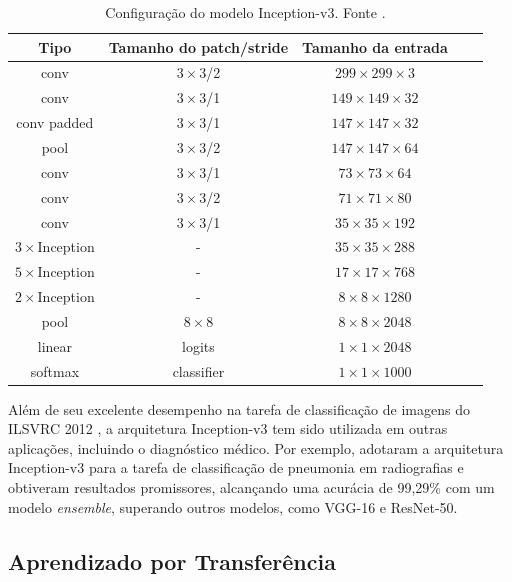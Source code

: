 \begin{table}[!htbp]
    \centering
    \footnotesize
    \begin{tabular}{|c|c|c|c|c|}
        \hline
        \textbf{Tipo} & \textbf{Tamanho do patch/stride} & \textbf{Tamanho da entrada} \\
        \hline
        conv & $3\times3$/2 & $299\times299\times3$ \\
        \hline
        conv & $3\times3$/1 & $149\times149\times32$ \\
        \hline
        conv padded & $3\times3$/1 & $147\times147\times32$ \\
        \hline
        pool & $3\times3$/2 & $147\times147\times64$ \\
        \hline
        conv & $3\times3$/1 & $73\times73\times64$ \\
        \hline
        conv & $3\times3$/2 & $71\times71\times80$ \\
        \hline
        conv & $3\times3$/1 & $35\times35\times192$ \\
        \hline
        $3\times$Inception & - & $35\times35\times288$ \\
        \hline
        $5\times$Inception & - & $17\times17\times768$ \\
        \hline
        $2\times$Inception & - & $8\times8\times1280$ \\
        \hline
        pool & $8\times8$ & $8\times8\times2048$ \\
        \hline
        linear & logits & $1\times1\times2048$ \\
        \hline
        softmax & classifier & $1\times1\times1000$ \\
        \hline
    \end{tabular}
    \caption{Configuração do modelo Inception-v3. Fonte .}
    \label{inception-v3-arch}
\end{table}

Além de seu excelente desempenho na tarefa de classificação de imagens do ILSVRC 2012 \cite{Russakovsky2015}, a arquitetura Inception-v3 tem sido utilizada em outras aplicações, incluindo o diagnóstico médico. Por exemplo,  adotaram a arquitetura Inception-v3 para a tarefa de classificação de pneumonia em radiografias e obtiveram resultados promissores, alcançando uma acurácia de 99,29\% com um modelo \textit{ensemble}, superando outros modelos, como VGG-16 e ResNet-50.

\subsection{Aprendizado por Transferência}

